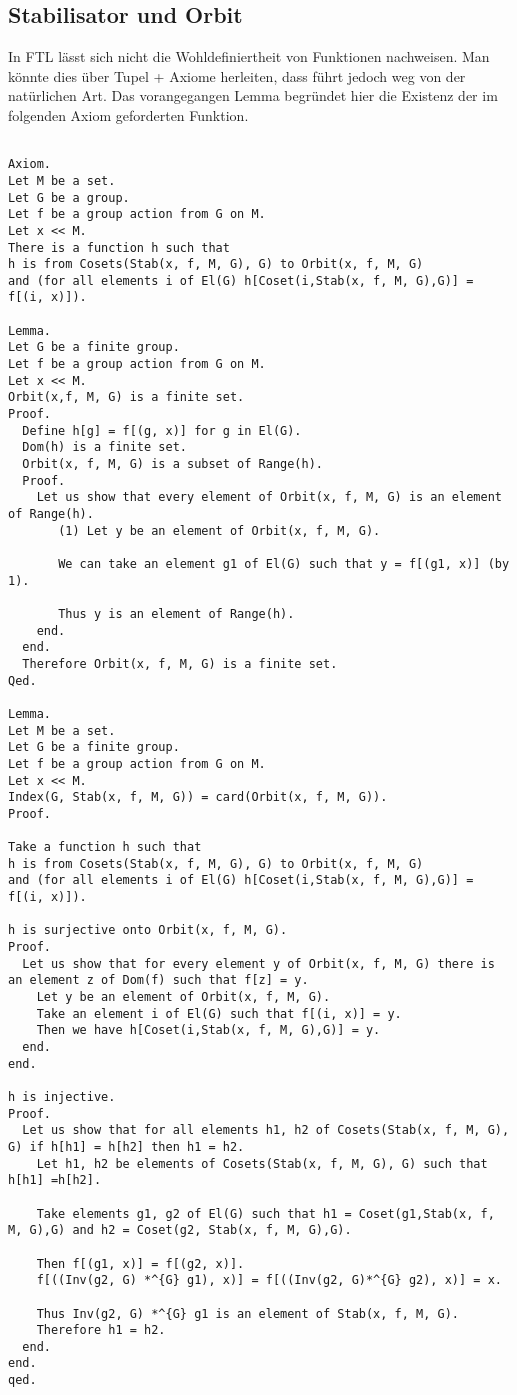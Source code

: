 \documentclass[a4paper,12pt]{scrartcl}
\begin{document}
\subsection{Stabilisator und Orbit}

In FTL lässt sich nicht die Wohldefiniertheit von Funktionen nachweisen.
Man könnte dies über Tupel + Axiome herleiten, dass führt jedoch weg von der natürlichen Art.
Das vorangegangen Lemma begründet hier die Existenz der im folgenden Axiom geforderten Funktion.

\begin{lstlisting}

Axiom.
Let M be a set.
Let G be a group.
Let f be a group action from G on M.
Let x << M.
There is a function h such that
h is from Cosets(Stab(x, f, M, G), G) to Orbit(x, f, M, G)
and (for all elements i of El(G) h[Coset(i,Stab(x, f, M, G),G)] = f[(i, x)]).

Lemma.
Let G be a finite group.
Let f be a group action from G on M.
Let x << M.
Orbit(x,f, M, G) is a finite set.
Proof.
  Define h[g] = f[(g, x)] for g in El(G).
  Dom(h) is a finite set.
  Orbit(x, f, M, G) is a subset of Range(h).
  Proof.
    Let us show that every element of Orbit(x, f, M, G) is an element of Range(h).
       (1) Let y be an element of Orbit(x, f, M, G).

       We can take an element g1 of El(G) such that y = f[(g1, x)] (by 1).

       Thus y is an element of Range(h).
    end.
  end.
  Therefore Orbit(x, f, M, G) is a finite set.
Qed.

Lemma.
Let M be a set.
Let G be a finite group.
Let f be a group action from G on M.
Let x << M.
Index(G, Stab(x, f, M, G)) = card(Orbit(x, f, M, G)).
Proof.

Take a function h such that
h is from Cosets(Stab(x, f, M, G), G) to Orbit(x, f, M, G)
and (for all elements i of El(G) h[Coset(i,Stab(x, f, M, G),G)] = f[(i, x)]).

h is surjective onto Orbit(x, f, M, G).
Proof.
  Let us show that for every element y of Orbit(x, f, M, G) there is an element z of Dom(f) such that f[z] = y.
    Let y be an element of Orbit(x, f, M, G).
    Take an element i of El(G) such that f[(i, x)] = y.
    Then we have h[Coset(i,Stab(x, f, M, G),G)] = y.
  end.
end.

h is injective.
Proof.
  Let us show that for all elements h1, h2 of Cosets(Stab(x, f, M, G), G) if h[h1] = h[h2] then h1 = h2.
    Let h1, h2 be elements of Cosets(Stab(x, f, M, G), G) such that h[h1] =h[h2].
    
    Take elements g1, g2 of El(G) such that h1 = Coset(g1,Stab(x, f, M, G),G) and h2 = Coset(g2, Stab(x, f, M, G),G).
  
    Then f[(g1, x)] = f[(g2, x)].
    f[((Inv(g2, G) *^{G} g1), x)] = f[((Inv(g2, G)*^{G} g2), x)] = x.
    
    Thus Inv(g2, G) *^{G} g1 is an element of Stab(x, f, M, G).
    Therefore h1 = h2.
  end.
end.
qed.
\end{lstlisting}
\end{document}
